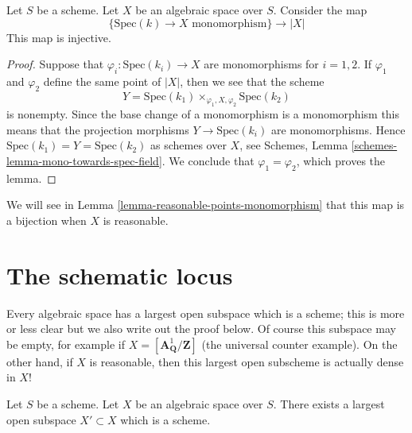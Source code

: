 \begin{lemma}
\label{lemma-points-monomorphism}
Let $S$ be a scheme. Let $X$ be an algebraic space over $S$.
Consider the map
$$
\{\text{Spec}(k) \to X \text{ monomorphism}\}
\longrightarrow
|X|
$$
This map is injective.
\end{lemma}

\begin{proof}
Suppose that $\varphi_i : \text{Spec}(k_i) \to X$ are monomorphisms
for $i = 1, 2$. If $\varphi_1$ and $\varphi_2$ define the same point
of $|X|$, then we see that the scheme
$$
Y = \text{Spec}(k_1) \times_{\varphi_1, X, \varphi_2} \text{Spec}(k_2)
$$
is nonempty. Since the base change of a monomorphism is a monomorphism
this means that the projection morphisms $Y \to \text{Spec}(k_i)$
are monomorphisms. Hence $\text{Spec}(k_1) = Y = \text{Spec}(k_2)$
as schemes over $X$, see
Schemes, Lemma \ref{schemes-lemma-mono-towards-spec-field}.
We conclude that $\varphi_1 = \varphi_2$, which proves the lemma.
\end{proof}

\noindent
We will see in Lemma \ref{lemma-reasonable-points-monomorphism} that this map
is a bijection when $X$ is reasonable.






\section{The schematic locus}
\label{section-schematic}

\noindent
Every algebraic space has a largest open subspace which is a
scheme; this is more or less clear but we also write out the proof below.
Of course this subspace may be empty, for example if
$X = [\mathbf{A}^1_{\mathbf{Q}}/\mathbf{Z}]$ (the universal
counter example). On the other hand, if $X$ is reasonable, then
this largest open subscheme is actually dense in $X$!

\begin{lemma}
\label{lemma-subscheme}
Let $S$ be a scheme.
Let $X$ be an algebraic space over $S$.
There exists a largest open subspace $X' \subset X$ which is a scheme.
\end{lemma}

